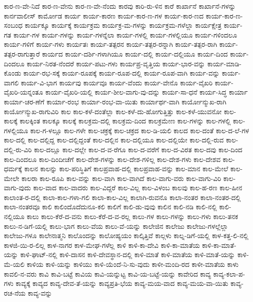 {ಕಾರ-ಣ-ವೇ-ನಿದೆ
ಕಾರ-ಣ-ವೇನು
ಕಾರ-ಣ-ವೇ-ನೆಂದು
ಕಾರವು
ಕಾರಿ-ರು-ಳಿನ
ಕಾರೆ
ಕಾರ್ಖಾನೆ
ಕಾರ್ಖಾನೆ-ಗಳನ್ನು
ಕಾರ್ನವಾಲೀಸ್
ಕಾರ್ಮೋಡ
ಕಾರ್ಯ
ಕಾರ್ಯ-ಕಾರಣ
ಕಾರ್ಯ-ಕಾರ-ಣ-ಗಳ
ಕಾರ್ಯ-ಕಾರ-ಣದ
ಕಾರ್ಯ-ಕಾರ-ಣ-ಸಂಬಂಧ
ಕಾರ್ಯಕ್ಕೂ
ಕಾರ್ಯಕ್ಕೆ
ಕಾರ್ಯಕ್ರಮ
ಕಾರ್ಯಕ್ರ-ಮ-ಗಳನ್ನು
ಕಾರ್ಯಕ್ರಮ-ಗಳೆಲ್ಲಾ
ಕಾರ್ಯಕ್ಷೇತ್ರ
ಕಾರ್ಯ-ಗತ
ಕಾರ್ಯ-ಗಳ
ಕಾರ್ಯ-ಗಳನ್ನು
ಕಾರ್ಯ-ಗಳನ್ನೆಲಾ
ಕಾರ್ಯ-ಗಳಲ್ಲಿ
ಕಾರ್ಯ-ಗಳಲ್ಲಿಯೂ
ಕಾರ್ಯ-ಗಳಿಂದಲೂ
ಕಾರ್ಯ-ಗಳಿಗೆ
ಕಾರ್ಯ-ಗಳು
ಕಾರ್ಯತಃ
ಕಾರ್ಯ-ತತ್ಪರನ
ಕಾರ್ಯ-ತತ್ಪರ-ರನ್ನಾಗಿ
ಕಾರ್ಯ-ತತ್ಪರ-ರಾಗಿ
ಕಾರ್ಯ-ತತ್ಪರ-ರಾಗುತ್ತಾರೆ
ಕಾರ್ಯದ
ಕಾರ್ಯ-ದರ್ಶಿ-ಗಳಾಗಿಯೂ
ಕಾರ್ಯ-ದಲ್ಲಿ
ಕಾರ್ಯ-ದಲ್ಲಿಯೂ
ಕಾರ್ಯ-ದಿಂದ
ಕಾರ್ಯ-ದಿಂದಲೂ
ಕಾರ್ಯ-ನಿರತ-ನೆಂದರೆ
ಕಾರ್ಯ-ಪಟು-ಗಳು
ಕಾರ್ಯಪ್ರ-ವೃತ್ತಿಯ
ಕಾರ್ಯ-ಭಾರ-ವನ್ನು
ಕಾರ್ಯ-ಮಾಡಿ-ಕೊಂಡು
ಕಾರ್ಯ-ರಭ-ಸಕ್ಕೆ
ಕಾರ್ಯ-ರೂಪಕ್ಕೆ
ಕಾರ್ಯ-ರೂಪ-ದಲ್ಲಿ
ಕಾರ್ಯ-ರೂಪ-ವಾಗಿ
ಕಾರ್ಯ-ವನ್ನು
ಕಾರ್ಯ-ವಾಗಲಿ
ಕಾರ್ಯ-ವಿ-ಭಾಗ
ಕಾರ್ಯವು
ಕಾರ್ಯವೂ
ಕಾರ್ಯ-ವೆಂದು
ಕಾರ್ಯ-ವೇನೊ
ಕಾರ್ಯ-ವೈಖರಿ
ಕಾರ್ಯ-ವೈಖರಿ-ಯನ್ನಂತೂ
ಕಾರ್ಯ-ವೈಖರಿ-ಯಲ್ಲಿ
ಕಾರ್ಯ-ಶೀಲ-ವಾಗು-ವು-ದನ್ನು
ಕಾರ್ಯ-ಸಾ-ಧನೆ
ಕಾರ್ಯ-ಸಿದ್ಧ
ಕಾರ್ಯಾ
ಕಾರ್ಯಾ-ಚರ-ಣೆಗೆ
ಕಾರ್ಯಾ-ರಂಭ
ಕಾರ್ಯಾ-ರಂಭ-ವಾ-ಯಿತು
ಕಾರ್ಯಾರ್ಥ-ವಾಗಿ
ಕಾರ್ಯೋನ್ಮುಖ-ರಾಗಿ
ಕಾರ್ಯೋನ್ಮುಖ-ರಾಗುವಿರಿ
ಕಾಲ
ಕಾಲ-ಕಳೆ-ದಂತೆಲ್ಲಾ
ಕಾಲ-ಕಳೆ-ದು-ಹೋಗುತ್ತಿತ್ತು
ಕಾಲ-ಕಳೆ-ಯುವನೋ
ಕಾಲ-ಕಾಲಕ್ಕೆ
ಕಾಲಕ್ಕಿಂತ
ಕಾಲಕ್ಕೂ
ಕಾಲಕ್ಕೆ
ಕಾಲಕ್ರಮ-ದಲ್ಲಿ
ಕಾಲಕ್ರಮ-ದಿಂದ
ಕಾಲಕ್ರಮೇಣ
ಕಾಲ-ಗಳನ್ನು
ಕಾಲ-ಗಳಲ್ಲಿ
ಕಾಲ-ಗಳಲ್ಲಿಯೂ
ಕಾಲ-ಗ-ಳಲ್ಲೂ
ಕಾಲ-ಗಳೇ
ಕಾಲ-ಚಕ್ರಕ್ಕೆ
ಕಾಲ-ಚಕ್ರದ
ಕಾಲ-ಡಿ-ಯಲಿ
ಕಾಲದ
ಕಾಲ-ದಂತೆ
ಕಾಲ-ದ-ಲೆ-ಗಳ
ಕಾಲ-ದಲ್ಲಿ
ಕಾಲ-ದಲ್ಲಿದ್ದ
ಕಾಲ-ದಲ್ಲಿದ್ದಂತೆ
ಕಾಲ-ದಲ್ಲಿನ
ಕಾಲ-ದಲ್ಲಿಯೂ
ಕಾಲ-ದಲ್ಲಿಯೇ
ಕಾಲ-ದಲ್ಲಿ-ರುವ
ಕಾಲ-ದಲ್ಲಿ-ರು-ವಿರಿ
ಕಾಲ-ದಲ್ಲೂ
ಕಾಲ-ದಲ್ಲೇ
ಕಾಲ-ದ-ವ-ರೆಗೂ
ಕಾಲ-ದ-ವರೆಗೆ
ಕಾಲ-ದ-ವಿರತ
ಕಾಲ-ದವು
ಕಾಲ-ದಿಂದ
ಕಾಲ-ದಿಂದಲೂ
ಕಾಲ-ದಿಂದೀಚೆಗೆ
ಕಾಲ-ದೇಶ-ಗಳನ್ನು
ಕಾಲ-ದೇಶ-ಗಳಿಲ್ಲ
ಕಾಲ-ದೇಶ-ಗಳು
ಕಾಲ-ದೇಶವ
ಕಾಲ-ಧರ್ಮಕ್ಕೆ
ಕಾಲನ
ಕಾಲನ್ನು
ಕಾಲ-ಪರಿಸ್ಥಿತಿಗೆ
ಕಾಲಪ್ರವಾಹ-ದಲ್ಲಿ
ಕಾಲಪ್ರವಾಹ-ವನ್ನು
ಕಾಲ-ಮಾನ
ಕಾಲ-ಮೇಲೆ
ಕಾಲ-ಮೇಲೇ
ಕಾಲರಾ
ಕಾಲ-ರೂಪಿ
ಕಾಲ-ವನ್ನು
ಕಾಲ-ವಾಗಿ
ಕಾಲ-ವಾಗಿದೆ
ಕಾಲ-ವಾಗು-ವರು
ಕಾಲ-ವಾಗು-ವಿರಿ
ಕಾಲ-ವಾಗು-ವುದು
ಕಾಲ-ವಾದ
ಕಾಲ-ವಾದರು
ಕಾಲ-ವಿದ್ದರೆ
ಕಾಲ-ವಿಲ್ಲ
ಕಾಲ-ವಿಳಂಬ
ಕಾಲವು
ಕಾಲ-ಹ-ರಣ
ಕಾಲ-ಹೀನ
ಕಾಲಾಂತ-ರ-ದಲ್ಲಿ
ಕಾಲಾ-ಕಾಲ-ಗಳಾ-ಗಲಿ
ಕಾಲಾ-ಕಾಲ-ವಿಲ್ಲ
ಕಾಲಾಗಿ-ರುವನೊ
ಕಾಲಾ-ನಂತರ
ಕಾಲಾ-ನಂತರ-ದಲ್ಲಿ
ಕಾಲಾ-ನಂತರವೂ
ಕಾಲಿ
ಕಾಲಿಂದೊದೆದುನೂ-ಕಲಿ
ಕಾಲಿಗೆ
ಕಾಲಿ-ಡು-ವುವು
ಕಾಲಿನ
ಕಾಲಿ-ನಡಿ
ಕಾಲಿ-ನಲ್ಲಿ
ಕಾಲಿ-ನಲ್ಲಿಯೂ
ಕಾಲು
ಕಾಲು-ಕೆರೆ-ದ-ವನು
ಕಾಲು-ಕೆರೆ-ದ-ವ-ರಲ್ಲ
ಕಾಲು-ಗಳ
ಕಾಲು-ಗಳನ್ನು
ಕಾಲು-ಗಳು
ಕಾಲು-ತನಕ
ಕಾಲು-ನ-ಡಿಗೆ-ಯಲ್ಲಿ
ಕಾಲು-ಭಾಗ
ಕಾಲು-ವೆಯ
ಕಾಲು-ವೆ-ಯನ್ನು
ಕಾಲೇಜಿನ
ಕಾಲೇಜು
ಕಾಲೇಜು-ಗಳಲ್ಲೆಲ್ಲಾ
ಕಾಲೇಜು-ಗಳೂ
ಕಾಲೇನಾತ್ಮನಿ
ಕಾಲೊಂದನ್ನು
ಕಾಲೋಹ್ಯಯಂ
ಕಾಲ್ಕಿತ್ತಿವೆ
ಕಾಲ್ಗಳು
ಕಾಲ್ನ-ಡಿಗೆ-ಯಲ್ಲಿ
ಕಾಳ-ಕತ್ತ-ಲಿ-ನಲ್ಲಿ
ಕಾಳಜಿ-ಯಿ-ರ-ಲಿಲ್ಲ
ಕಾಳ-ನಾಗರ
ಕಾಳ-ಮೇಘ-ಗಳೆಲ್ಲ
ಕಾಳಿ
ಕಾಳಿ-ಕಾ-ದೇವಿ
ಕಾಳಿ-ಕಾ-ಮಾತೆಯ
ಕಾಳಿ-ಕಾ-ಮಾತೆ-ಯನ್ನು
ಕಾಳಿ-ಘಾಟ್-ನಲ್ಲಿ
ಕಾಳಿ-ದಾಸನ
ಕಾಳಿ-ದೇವಸ್ಥಾನ-ದಲ್ಲಿ
ಕಾಳಿ-ಮಾತೆ
ಕಾಳಿ-ಮಾತೆಯ
ಕಾಳಿ-ಮಾತೆ-ಯನ್ನು
ಕಾಳಿ-ಮೆ-ಯಲಿ
ಕಾಳಿಯ
ಕಾಳಿ-ಯನ್ನು
ಕಾಳಿಯು
ಕಾಳಿ-ಯೆಂದೆ-ನಿ-ಸು-ವುದು
ಕಾಳೀ-ಮಂದಿ-ರದ
ಕಾಳೀ-ಮಾತೆಯ
ಕಾಳು
ಕಾವಲಿ-ನ-ವರು
ಕಾವಿ
ಕಾವಿ-ಬಟ್ಟೆ
ಕಾವಿಯ
ಕಾವಿ-ಯನ್ನುಟ್ಟ
ಕಾವಿ-ಯ-ಬಟ್ಟೆ-ಯನ್ನು
ಕಾವೇರಿದ
ಕಾವ್ಯ
ಕಾವ್ಯ-ಕಲಾ-ಪ-ಗಳು
ಕಾವ್ಯಕ್ಕೆ
ಕಾವ್ಯದ
ಕಾವ್ಯ-ದೇವ-ತೆ-ಯನ್ನು
ಕಾವ್ಯಪ್ರತಿ-ಭೆಯ
ಕಾವ್ಯ-ಮಯ-ವಾದ
ಕಾವ್ಯ-ಮಯ-ವಾ-ಯಿತು
ಕಾವ್ಯ-ರಚ-ನೆಯ
ಕಾವ್ಯ-ವನ್ನು
}
